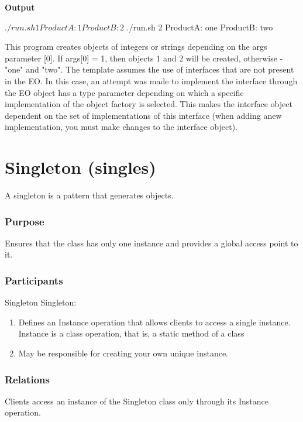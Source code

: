 \documentclass[12pt]{book}
\begin{document}
\textbf{Output}
\begin{ffcode}
$ ./run.sh 1
ProductA: 1
ProductB: 2
$ ./run.sh 2
ProductA: one
ProductB: two
\end{ffcode}


This program creates objects of integers or strings depending on the args parameter [0]. If  args[0] = 1, then objects 1 and 2 will be created, otherwise -  "one"  and  "two".
The template assumes the use of interfaces that are not present in the  EO. In this case, an attempt was made to implement the interface through the EO  object has a type parameter depending on which a specific implementation of the object factory is selected. This makes the interface object dependent on the set of implementations of this interface (when adding anew implementation, you must make changes to the interface object).

\section{Singleton (singles)}
A singleton is a pattern that generates objects.

\subsubsection{Purpose}
Ensures that the class has only one instance and provides a global access point to it.

\subsubsection{Participants}
Singleton Singleton:
\begin{enumerate}
    \item Defines an Instance operation that allows clients to access a single instance. Instance is a class operation,  that is,  a static method of a class
    \item May be responsible for creating your own unique instance.
\end{enumerate}

\subsubsection{Relations}
Clients access an instance of the Singleton class only through its Instance operation. 
\end{document}
